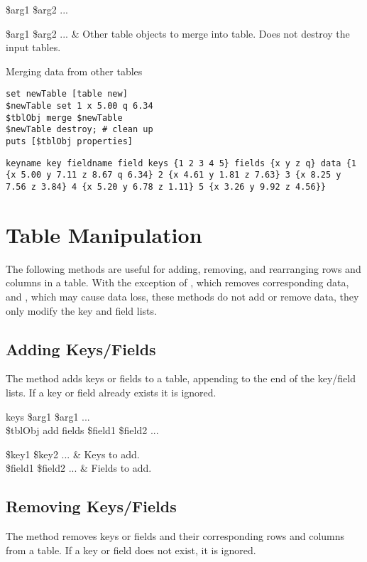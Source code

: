 \begin{syntax}
 \$arg1 \$arg2 ...
\end{syntax}
\begin{args}
\$arg1 \$arg2 ... & Other table objects to merge into table. Does not destroy the input tables. 
\end{args}

\begin{example}{Merging data from other tables}
\begin{lstlisting}
set newTable [table new]
$newTable set 1 x 5.00 q 6.34
$tblObj merge $newTable
$newTable destroy; # clean up
puts [$tblObj properties]
\end{lstlisting}
\tcblower
\begin{lstlisting}
keyname key fieldname field keys {1 2 3 4 5} fields {x y z q} data {1 {x 5.00 y 7.11 z 8.67 q 6.34} 2 {x 4.61 y 1.81 z 7.63} 3 {x 8.25 y 7.56 z 3.84} 4 {x 5.20 y 6.78 z 1.11} 5 {x 3.26 y 9.92 z 4.56}}
\end{lstlisting}
\end{example}
\clearpage
\section{Table Manipulation}
The following methods are useful for adding, removing, and rearranging rows and columns in a table.
With the exception of , which removes corresponding data, and , which may cause data loss, these methods do not add or remove data, they only modify the key and field lists. 

\subsection{Adding Keys/Fields}
The method  adds keys or fields to a table, appending to the end of the key/field lists. If a key or field already exists it is ignored.

\begin{syntax}
 keys \$arg1 \$arg1 ... \\
\$tblObj add fields \$field1 \$field2 ...
\end{syntax}
\begin{args}
\$key1 \$key2 ... & Keys to add. \\
\$field1 \$field2 ... & Fields to add.
\end{args}

\subsection{Removing Keys/Fields}
The method   removes keys or fields and their corresponding rows and columns from a table. If a key or field does not exist, it is ignored. 

